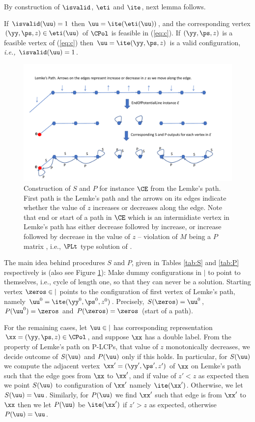 \medskip

By construction of $\isvalid$, $\eti$ and $\ite$, next lemma follows.
\begin{lemma}\label{lem:vert}
If $\isvalid(\uu)=1$ then $\uu=\ite(\eti(\uu))$, and the corresponding vertex $(\yy,\ps,z)\in \eti(\uu)$ of $\CPol$ is feasible in (\ref{eq:c}). If $(\yy,\ps,z)$ is a feasible vertex of (\ref{eq:c}) then $\uu=\ite(\yy,\ps,z)$ is a valid configuration, {\em i.e.,} $\isvalid(\uu)=1$.
\end{lemma}


\begin{figure}[htbp]
   \centering
  \includegraphics[width=\textwidth]{plcp-fig.pdf}
 \caption{Construction of $S$ and $P$ for \EOPL instance $\CE$ from the Lemke's path. First path is the Lemke's path and the arrows on its edges indicate whether the value of $z$ increases or decreases along the edge. Note that end or start of a path in $\CE$ which is an intermidiate vertex in Lemke's path 
 has either decrease followed by increase, or increase followed by decrease in the value of $z$ -- violation of $M$ being a $P$ matrix \cite{cottle2009linear}, i.e., $\PLt$ type solution of \PLCP.}\label{fig:path}
\end{figure}   


The main idea behind procedures $S$ and $P$, given in Tables \ref{tab:S} and \ref{tab:P} respectively is (also see Figure \ref{fig:path}): Make dummy configurations in $\vert$ to point to themselves, i.e., cycle of length one, so that they can never be a solution. Starting vertex $\zeros \in \vert$ points to the configuration of first vertex of Lemke's path, namely $\uu^0=\ite(\yy^0,\ps^0,z^0)$. Precisely, $S(\zeros)=\uu^0$, $P(\uu^0)=\zeros$ and $P(\zeros)=\zeros$ (start of a path). 

For the remaining cases, let $\uu\in \vert$ has corresponding representation $\xx=(\yy,\ps,z)\in \CPol$, and suppose $\xx$ has a double label. From the property of Lemke's path on P-LCPs, that value of $z$ monotonically decreases, we decide outcome of $S(\uu)$ and $P(\uu)$ only if this holds. In particular, for $S(\uu)$ we compute the adjacent vertex $\xx'=(\yy',\ps',z')$ of $\xx$ on Lemke's path such that the edge goes from $\xx$ to $\xx'$, and if value of $z'<z$ as expected then we point $S(\uu)$ to configuration of $\xx'$ namely $\ite(\xx')$. Otherwise, we let $S(\uu)=\uu$. Similarly, for $P(\uu)$ we find $\xx'$ such that edge is from $\xx'$ to $\xx$ then we let $P(\uu)$ be $\ite(\xx')$ if $z'>z$ as expected, otherwise $P(\uu)=\uu$. 

